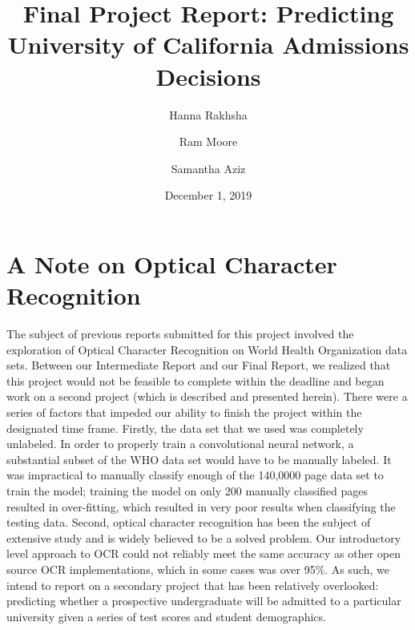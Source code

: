\documentclass{article}
\title{Final Project Report: Predicting University of California Admissions Decisions}
\author{Hanna Rakhsha \and Ram Moore \and Samantha Aziz}
\date{December 1, 2019}
\begin{document}
\maketitle

\section{A Note on Optical Character Recognition}
The subject of previous reports submitted for this project involved the exploration of Optical Character Recognition on World Health Organization data sets. Between our Intermediate Report and our Final Report, we realized that this project would not be feasible to complete within the deadline and began work on a second project (which is described and presented herein).\newline\indent
There were a series of factors that impeded our ability to finish the project within the designated time frame. Firstly, the data set that we used was completely unlabeled. In order to properly train a convolutional neural network, a substantial subset of the WHO data set would have to be manually labeled. It was impractical to manually classify enough of the 140,0000 page data set to train the model; training the model on only 200 manually classified pages resulted in over-fitting, which resulted in very poor results when classifying the testing data. Second, optical character recognition has been the subject of extensive study and is widely believed to be a solved problem. Our introductory level approach to OCR could not reliably meet the same accuracy as other open source OCR implementations, which in some cases was over 95\%. \newline \indent
As such, we intend to report on a secondary project that has been relatively overlooked: predicting whether a prospective undergraduate will be admitted to a particular university given a series of test scores and student demographics.
\end{document}
